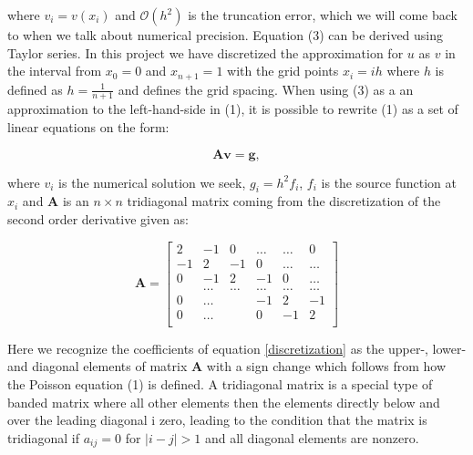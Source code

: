 \documentclass[12pt]{article}
\numberwithin{figure}{section}
\numberwithin{table}{section}
\begin{document}
\noindent where $v_i=v(x_i)$ and $\mathcal{O}(h^2)$ is the truncation error, which we will come back to when we talk about numerical precision. Equation (3) can be derived using Taylor series. In this project we have discretized the approximation for $u$ as $v$ in the interval from $x_0=0$ and $x_{n+1}=1$ with the grid points $x_i=ih$ where $h$ is defined as $h=\frac{1}{n+1}$ and defines the grid spacing. When using (3) as a an approximation to the left-hand-side in (1), it is possible to rewrite (1) as a set of linear equations on the form: 

\begin{equation}
	\label{matrixeq}
   \mathbf{A}\mathbf{v} = \mathbf{g},
\end{equation}

\noindent where $v_i$ is the numerical solution we seek, $g_i=h^2f_i$, $f_i$ is the source function at $x_i$ and $\mathbf{A}$ is an $n\times n$ tridiagonal matrix coming from the discretization of the second order derivative given as:

\begin{equation}
    \mathbf{A} = \begin{bmatrix}
                           2& -1& 0 &\dots   & \dots &0 \\
                           -1 & 2 & -1 &0 &\dots &\dots \\
                           0&-1 &2 & -1 & 0 & \dots \\
                           & \dots   & \dots &\dots   &\dots & \dots \\
                           0&\dots   &  &-1 &2& -1 \\
                           0&\dots    &  & 0  &-1 & 2 \\
                      \end{bmatrix} \label{matrixA}
\end{equation}




\noindent Here we recognize the coefficients of equation \eqref{discretization} as the upper-, lower- and diagonal elements of matrix $\mathbf{A}$ with a sign change which follows from how the Poisson equation (1) is defined. A tridiagonal matrix is a special type of banded matrix where all other elements then the elements directly below and over the leading diagonal i zero, leading to the condition that the matrix is tridiagonal if $a_{ij}=0$ for $|i-j|>1$ and all diagonal elements are nonzero.\\
\end{document}
